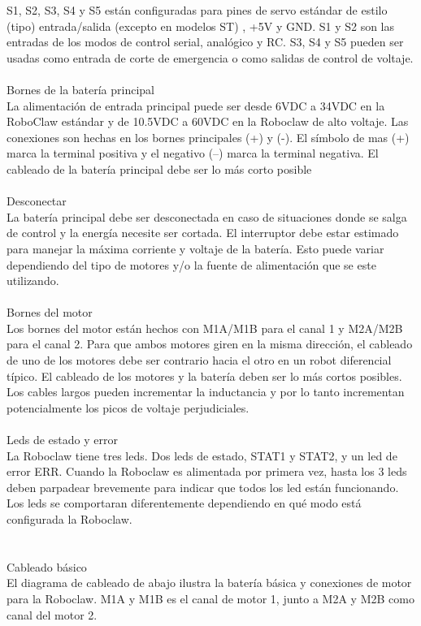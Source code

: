 \documentclass[user_manual.tex]{subfiles}
\begin{document}
S1, S2, S3, S4 y S5 están configuradas para pines de servo estándar de estilo (tipo) entrada/salida (excepto en modelos ST)
, +5V y GND. S1 y S2 son las entradas  de los modos de control serial, analógico y RC. S3, S4 y S5 pueden ser usadas como
entrada de corte de emergencia o como salidas de control de voltaje.\\
\\
Bornes de la batería principal\\
La alimentación de entrada principal puede ser desde 6VDC a 34VDC en la RoboClaw estándar y de 10.5VDC a 60VDC en la Roboclaw
de alto voltaje. Las conexiones son hechas en los bornes principales (+) y (-). El símbolo de mas (+) marca la terminal
positiva y el negativo (–) marca la terminal negativa. El cableado de la batería principal debe ser lo más corto posible \\
\\
Desconectar\\
La batería principal debe ser desconectada en caso de situaciones donde se salga de control y la energía necesite ser
cortada. El interruptor debe estar estimado para manejar la máxima corriente y voltaje de la batería. Esto puede variar
dependiendo del tipo de motores y/o la fuente de alimentación que se este utilizando.\\
\\
Bornes del motor\\
Los bornes del motor están hechos con M1A/M1B para el canal 1 y M2A/M2B para el canal 2. Para que ambos motores giren en
la misma dirección, el cableado de uno de los motores debe ser contrario hacia el otro en un robot diferencial típico. El
cableado de los motores y la batería deben ser lo más cortos posibles. Los cables largos pueden incrementar la inductancia
y por lo tanto incrementan potencialmente los picos de voltaje perjudiciales.\\
\\

Leds de estado y error\\
La Roboclaw tiene tres leds. Dos leds de estado, STAT1 y STAT2, y un led de error ERR. Cuando la Roboclaw es alimentada por
primera vez, hasta los 3 leds deben parpadear brevemente para indicar que todos los led están funcionando. Los leds se
comportaran diferentemente dependiendo en qué modo está configurada la Roboclaw.\\
\\
\\
Cableado básico\\
El diagrama de cableado de abajo ilustra la batería básica y conexiones de motor para la Roboclaw. M1A y M1B es el canal
de motor 1, junto a M2A y M2B como canal del motor 2.\\
\end{document}
